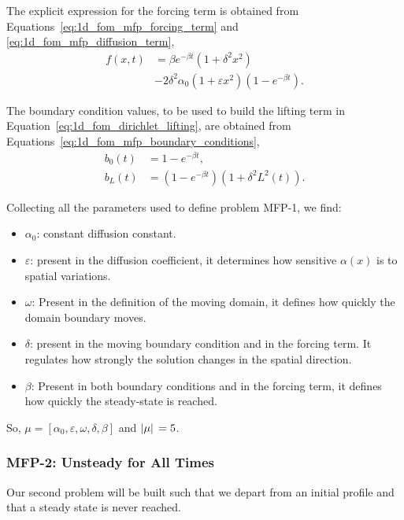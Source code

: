 \documentclass[../main.tex]{subfiles}
\begin{document}
The explicit expression for the forcing term is obtained from Equations~\eqref{eq:1d_fom_mfp_forcing_term} and \eqref{eq:1d_fom_mfp_diffusion_term},
\begin{equation}
    \begin{split}
        f(x,t) &= \beta e^{-\beta t} (1+\delta^2 x^2) \\
        &- 2 \delta^2 \alpha_0(1 + \varepsilon x^2) \left(1 - e^{-\beta t}\right).    
    \end{split}
\end{equation}

The boundary condition values, to be used to build the lifting term in Equation~\eqref{eq:1d_fom_dirichlet_lifting}, are obtained from Equations~\eqref{eq:1d_fom_mfp_boundary_conditions},
\begin{subequations}
    \begin{align}
        b_0(t) &= 1 - e^{-\beta t}, \\
        b_L(t) &= \left(1 - e^{-\beta t}\right)\left(1 + \delta^2 L^{2}(t)\right).
    \end{align}
\end{subequations}

Collecting all the parameters used to define problem MFP-1, we find:
\begin{itemize}
    \item $\alpha_0$: constant diffusion constant. 
    \item $\varepsilon$: present in the diffusion coefficient, it determines how sensitive $\alpha(x)$ is to spatial variations. 
    \item $\omega$: Present in the definition of the moving domain, it defines how quickly the domain boundary moves.
    \item $\delta$: present in the moving boundary condition and in the forcing term. 
    It regulates how strongly the solution changes in the spatial direction.
    \item $\beta$: Present in both boundary conditions and in the forcing term, it defines how quickly the steady-state is reached.
\end{itemize}
So, $\mu = [\alpha_0, \varepsilon, \omega, \delta, \beta]$ and $\abs*{\mu} = 5$.

\subsubsection{MFP-2: Unsteady for All Times}
Our second problem will be built such that we depart from an initial profile and that a steady state is never reached. 
\end{document}
